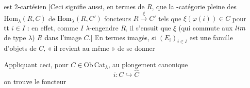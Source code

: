 \documentclass[11pt,a4paper]{article}
\begin{document}

 est 2-cartésien [Ceci signifie aussi, en termes
de $R$, que la -catégorie pleine des
$\mathrm{Hom}_{\lambda}(R, C)$ de $\mathrm{Hom}_{\lambda}(R, C')$
  foncteurs $R
\xrightarrow{\ \xi\ } C'$ tels que $\xi(\varphi(i)) \in C$ pour tt $i
\in I$ : en effet, comme $I$ $\lambda$-engendre $R$, il s'ensuit que
$\xi$ (qui commute aux $\varprojlim$ de type $\lambda$)
 $R$ dans l'image  
$C$.]  En termes imagés,
si $(E_{i})_{i \in I}$ est une famille d'objets de $C$, « il
revient au même » de se donner 

Appliquant ceci, pour $C \in \mathrm{Ob}\,\mathrm{Cat}_{\lambda}$, au
plongement canonique
\begin{equation}
  i : C \hookrightarrow \hat{C}
  \tag{8.2.4}
\end{equation}
 on trouve le foncteur

\end{document}
